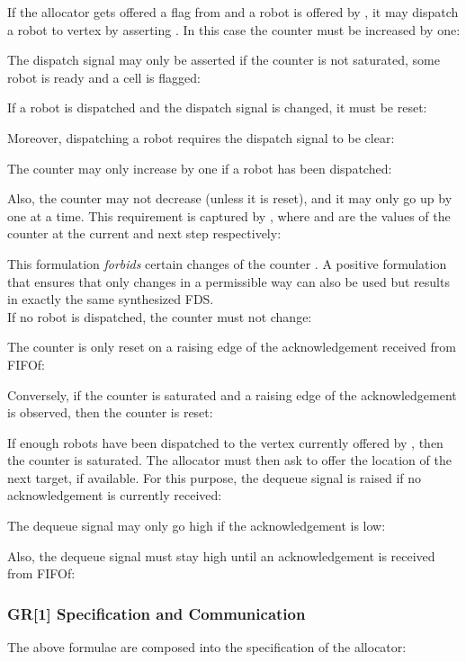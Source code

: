 If the allocator gets offered a flag  from  and a robot is offered by , it may dispatch a robot to vertex  by asserting . In this case the counter  must be increased by one:


The dispatch signal may only be asserted if the counter  is not saturated, some robot is ready and a cell is flagged:

If a robot is dispatched and the dispatch signal is changed, it must be reset:

Moreover, dispatching a robot requires the dispatch signal to be clear:


The counter may only increase by one if a robot has been dispatched:

Also, the counter may not decrease (unless it is reset), and it may only go up by one at a time. This requirement is captured by , where  and  are the values of the counter at the current and next step respectively:

This formulation \emph{forbids} certain changes of the counter . A positive formulation that ensures that  only changes in a permissible way can also be used but results in exactly the same synthesized FDS.\\

If no robot is dispatched, the counter must not change:

The counter is only reset on a raising edge of the acknowledgement received from FIFOf:

Conversely, if the counter is saturated and a raising edge of the acknowledgement is observed, then the counter is reset:


If enough robots have been dispatched to the vertex currently offered by , then the counter  is saturated. The allocator must then ask  to offer the location of the next target, if available. For this purpose, the dequeue signal  is raised if no acknowledgement is currently received:

The dequeue signal may only go high if the acknowledgement is low:

Also, the dequeue signal must stay high until an acknowledgement is received from FIFOf:



\subsubsection{GR[1] Specification and Communication}  

The above formulae are composed into the specification of the allocator:

